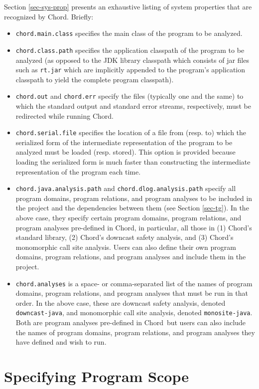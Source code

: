 \documentclass{article}
\providecommand\Chord{{Chord}}
\begin{document}
Section \ref{sec-sys-prop} presents an exhaustive
listing of system properties that are recognized by \Chord.
Briefly:
\begin{itemize}
\item
{\tt chord.main.class} specifies the main class of the program
to be analyzed.
\item
{\tt chord.class.path} specifies the application classpath of the program to be analyzed (as opposed to the
JDK library classpath which consists of jar files such as {\tt rt.jar}
which are implicitly appended to the program's application classpath to yield the
complete program classpath).
\item
{\tt chord.out} and {\tt chord.err} specify the files (typically one and the same) to which the standard output and
standard error streams, respectively, must be redirected while running Chord.
\item
{\tt chord.serial.file} specifies the location of a file from (resp. to) which
the serialized form of the intermediate representation of the program to be analyzed must be loaded (resp. stored).
This option is provided because loading the serialized form is much faster than
constructing the intermediate representation of the program each time.
\item
{\tt chord.java.analysis.path} and {\tt chord.dlog.analysis.path} 
specify all program domains, program relations, and program analyses
to be included in the project and the
dependencies between them (see Section \ref{sec-tg}).
In the above case, they specify certain
 program domains, program relations, and program analyses
pre-defined in \Chord, in particular, all those in (1) Chord's standard library, (2) Chord's downcast safety
analysis, and (3) Chord's monomorphic call site analysis.
Users can also define their own
program domains, program relations, and program analyses and include them in the project.
\item
{\tt chord.analyses} is a space- or comma-separated list of the names of program domains,
program relations, and program analyses that must be run in that order.  In the above case,
these are downcast safety analysis, denoted {\tt downcast-java}, and monomorphic call site analysis,
denoted {\tt monosite-java}.
Both are program analyses pre-defined in \Chord\ 
but users can also include the names
of program domains, program relations, and program analyses they have defined and wish to run.
\end{itemize}

\texonly{\newpage}
\section{Specifying Program Scope}
\end{document}
